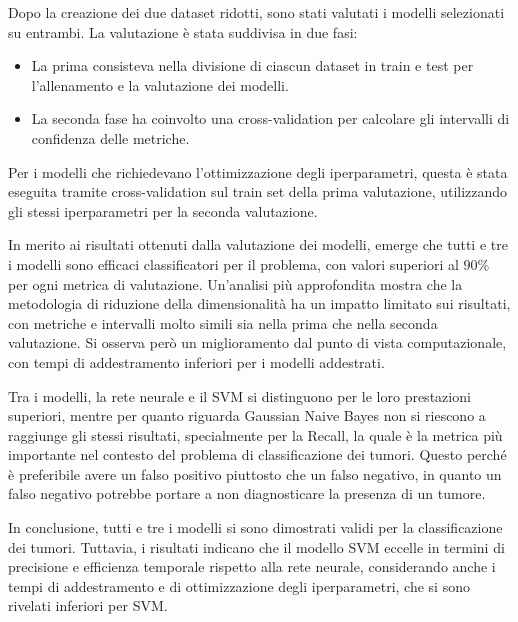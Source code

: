 Dopo la creazione dei due dataset ridotti, sono stati valutati i modelli
selezionati su entrambi. La valutazione è stata suddivisa in due fasi:
\begin{itemize}
    \item La prima consisteva nella divisione di ciascun dataset in train e test
          per l'allenamento e la valutazione dei modelli.
    \item La seconda fase ha coinvolto una cross-validation per calcolare gli
          intervalli di confidenza delle metriche.
\end{itemize}
Per i modelli che richiedevano l'ottimizzazione degli iperparametri, questa è
stata eseguita tramite cross-validation sul train set della prima valutazione,
utilizzando gli stessi iperparametri per la seconda valutazione.

In merito ai risultati ottenuti dalla valutazione dei modelli, emerge che tutti
e tre i modelli sono efficaci classificatori per il problema, con valori
superiori al $90\%$ per ogni metrica di valutazione. Un'analisi più approfondita
mostra che la metodologia di riduzione della dimensionalità ha un impatto
limitato sui risultati, con metriche e intervalli molto simili sia nella prima
che nella seconda valutazione. Si osserva però un miglioramento dal punto di
vista computazionale, con tempi di addestramento inferiori per i modelli addestrati.

Tra i modelli, la rete neurale e il SVM si distinguono per le loro prestazioni
superiori, mentre per quanto riguarda Gaussian Naive Bayes non si riescono a
raggiunge gli stessi risultati, specialmente per la Recall, la quale è la metrica
più importante nel contesto del problema di classificazione dei tumori. Questo
perché è preferibile avere un falso positivo piuttosto che un falso negativo,
in quanto un falso negativo potrebbe portare a non diagnosticare la presenza di
un tumore.

In conclusione, tutti e tre i modelli si sono dimostrati validi per la
classificazione dei tumori. Tuttavia, i risultati indicano che il modello SVM
eccelle in termini di precisione e efficienza temporale rispetto alla rete
neurale, considerando anche i tempi di addestramento e di ottimizzazione degli
iperparametri, che si sono rivelati inferiori per SVM.